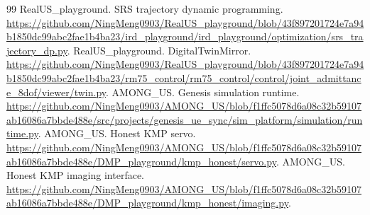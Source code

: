 \documentclass[UTF8,11pt,a4paper,fontset=fandol]{ctexart}
\numberwithin{equation}{section}
\theoremstyle{definition}
\begin{document}
\begin{thebibliography}{99}
 RealUS\_playground. SRS trajectory dynamic programming. \url{https://github.com/NingMeng0903/RealUS_playground/blob/43f897201724e7a94b1850dc99abc2fae1b4ba23/ird_playground/ird_playground/optimization/srs_trajectory_dp.py}.
 RealUS\_playground. DigitalTwinMirror. \url{https://github.com/NingMeng0903/RealUS_playground/blob/43f897201724e7a94b1850dc99abc2fae1b4ba23/rm75_control/rm75_control/control/joint_admittance_8dof/viewer/twin.py}.
 AMONG\_US. Genesis simulation runtime. \url{https://github.com/NingMeng0903/AMONG_US/blob/f1ffc5078d6a08c32b59107ab16086a7bbde488e/src/projects/genesis_ue_sync/sim_platform/simulation/runtime.py}.
 AMONG\_US. Honest KMP servo. \url{https://github.com/NingMeng0903/AMONG_US/blob/f1ffc5078d6a08c32b59107ab16086a7bbde488e/DMP_playground/kmp_honest/servo.py}.
 AMONG\_US. Honest KMP imaging interface. \url{https://github.com/NingMeng0903/AMONG_US/blob/f1ffc5078d6a08c32b59107ab16086a7bbde488e/DMP_playground/kmp_honest/imaging.py}.
\end{thebibliography}
\end{document}
